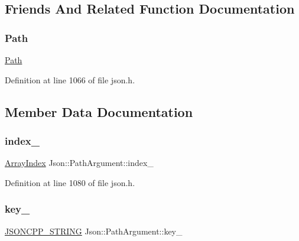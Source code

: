 \subsection{Friends And Related Function Documentation}
\hypertarget{class_json_1_1_path_argument_a51971c24df68e5ad775ed4f8c33e968f}{}\label{class_json_1_1_path_argument_a51971c24df68e5ad775ed4f8c33e968f} 
\subsubsection{\texorpdfstring{Path}{Path}}
{\footnotesize\ttfamily \hyperlink{class_json_1_1_path}{Path}\hspace{0.3cm}{\ttfamily [friend]}}



Definition at line 1066 of file json.\+h.



\subsection{Member Data Documentation}
\hypertarget{class_json_1_1_path_argument_afd5857d1b6bfaae6961333bdae7bd5ec}{}\label{class_json_1_1_path_argument_afd5857d1b6bfaae6961333bdae7bd5ec} 
\subsubsection{\texorpdfstring{index\+\_\+}{index\_}}
{\footnotesize\ttfamily \hyperlink{namespace_json_a8048e741f2177c3b5d9ede4a5b8c53c2}{Array\+Index} Json\+::\+Path\+Argument\+::index\+\_\+\hspace{0.3cm}{\ttfamily [private]}}



Definition at line 1080 of file json.\+h.

\hypertarget{class_json_1_1_path_argument_af4024368548ff730ef2bed97d6f1ca43}{}\label{class_json_1_1_path_argument_af4024368548ff730ef2bed97d6f1ca43} 
\subsubsection{\texorpdfstring{key\+\_\+}{key\_}}
{\footnotesize\ttfamily \hyperlink{config_8h_a1e723f95759de062585bc4a8fd3fa4be}{J\+S\+O\+N\+C\+P\+P\+\_\+\+S\+T\+R\+I\+NG} Json\+::\+Path\+Argument\+::key\+\_\+\hspace{0.3cm}{\ttfamily [private]}}



